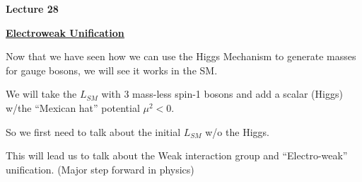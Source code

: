 
\usepackage{braket}
\usepackage{bbm}
\usepackage{relsize}
\usepackage{tcolorbox}




\usepackage{fancyhdr}
\usepackage{ dsfont }


\fancyhf{}


\thispagestyle{fancy}

\begin{center}
{\huge \textbf{Lecture 28}}
\end{center}

{\fontsize{14}{16}\selectfont

%
%
%
%
%
%
%
%
%
%
%
%

\textbf{\underline{\underline{Electroweak Unification}}}

Now that we have seen how we can use the Higgs Mechanism to generate masses for gauge bosons, we will see it works in the SM.

We will take the $L_{SM}$ with 3 mass-less spin-1 bosons and add a scalar (Higgs) w/the ``Mexican hat'' potential $\mu^2 < 0 $.

So we first need to talk about the initial $L_{SM}$ w/o the Higgs. 

This will lead us to talk about the Weak interaction group and ``Electro-weak'' unification. 
(Major step forward in physics) 

}
